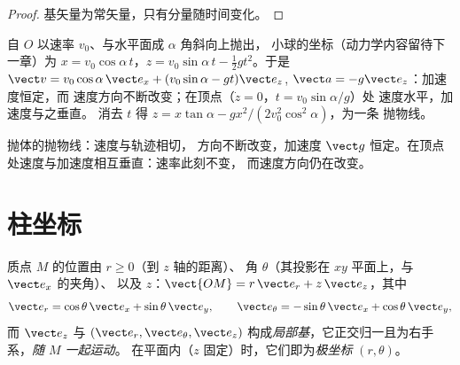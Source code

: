 \begin{proof}
基矢量为常矢量，只有分量随时间变化。
\end{proof}

\begin{example}[抛体]\label{ex:b1:point-kinematics:projectile}
自 $O$ 以速率 $v_0$、与水平面成 $\alpha$ 角斜向上抛出，
小球的坐标（动力学内容留待下一章）为
$x = v_0\cos\alpha\,t$，$z = v_0\sin\alpha\,t - \tfrac12 gt^2$。于是
$\vect v = v_0\cos\alpha\,\vect e_x + (v_0\sin\alpha - gt)\vect e_z$,
$\vect a = -g\vect e_z$：加速度恒定，而
速度方向不断改变；在顶点（$\dot z = 0$，$t = v_0\sin\alpha/g$）处
速度水平，加速度与之垂直。
消去 $t$ 得 $z = x\tan\alpha - gx^2/(2v_0^2\cos^2\alpha)$，为一条
抛物线。
\end{example}

\begin{omfigure}

{\small 抛体的抛物线：速度与轨迹相切，
方向不断改变，加速度 $\vect g$ 恒定。在顶点
处速度与加速度相互垂直：速率此刻不变，
而速度方向仍在改变。}
\end{omfigure}

\section{柱坐标}

\begin{definition}[柱坐标与基]\label{def:b1:point-kinematics:cylindrical}
质点 $M$ 的位置由 $r \geq 0$（到 $z$ 轴的距离）、
角 $\theta$（其投影在 $xy$ 平面上，与 $\vect e_x$ 的夹角）、
以及 $z$：$\vect{OM} = r\,\vect e_r + z\,\vect e_z$，其中
\[
\vect e_r = \cos\theta\,\vect e_x + \sin\theta\,\vect e_y, \qquad
\vect e_\theta = -\sin\theta\,\vect e_x + \cos\theta\,\vect e_y,
\]
而 $\vect e_z$ 与 $(\vect e_r, \vect e_\theta,
\vect e_z)$ 构成\emph{局部基}，它正交归一且为右手系，\emph{随 $M$ 一起运动}。
在平面内（$z$ 固定）时，它们即为\emph{极坐标} $(r, \theta)$。
\end{definition}

